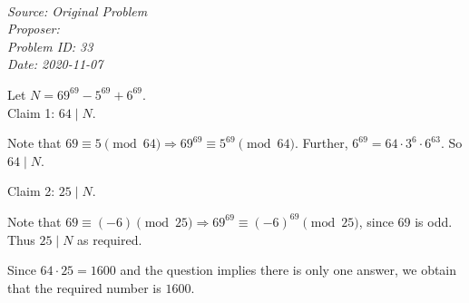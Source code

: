 \SSbreak\\
\emph{Source: Original Problem}\\
\emph{Proposer: \Ppi}\\
\emph{Problem ID: 33}\\
\emph{Date: 2020-11-07}\\
\SSbreak

\bigskip

\begin{solution}\hfil\medskip

    Let $N = 69^{69} - 5^{69} + 6^{69}$. \\
    
    Claim 1: $64 \mid N$. 
    
    \begin{subproof}
        Note that $69 \equiv 5 \pmod{64} \Rightarrow 69^{69} \equiv 5^{69} \pmod{64}$. Further, $6^{69}=64\cdot3^{6}\cdot6^{63}$. So $64 \mid N$. 
    \end{subproof}

    Claim 2: $25 \mid N$.

    \begin{subproof}
        Note that $69 \equiv (-6) \pmod{25} \Rightarrow 69^{69} \equiv (-6)^{69} \pmod{25}$, since 69 is odd. Thus $25 \mid N$ as required. 
    \end{subproof}

    Since $64 \cdot 25 = 1600$ and the question implies there is only one answer, we obtain that the required number is $\boxed{1600}$. 
\end{solution}\bigskip